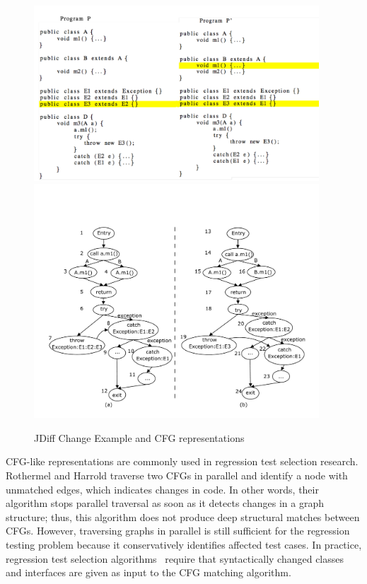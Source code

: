 \begin{figure}
\centering
\includegraphics[width=0.95\textwidth]{images/JDiffCodeExample.pdf}
\includegraphics[width=0.95\textwidth]{images/JDiffCFG.pdf}
\caption{JDiff Change Example and CFG representations~\cite{Apiwattanapong2005}} 
\label{fig:JDiff} 
\end{figure}

CFG-like representations are commonly used in regression test selection research. Rothermel and Harrold \cite{Rothermel1997} traverse two CFGs in parallel and identify a node with unmatched edges, which indicates changes in code. In other words, their algorithm stops parallel traversal as soon as it detects changes in a graph structure; thus, this algorithm does not produce deep structural matches between CFGs. However, traversing graphs in parallel is still sufficient for the regression testing problem because it conservatively identifies affected test cases. In practice, regression test selection algorithms~\cite{Harrold2001, Orso2004} require that syntactically changed classes and interfaces are given as input to the CFG matching algorithm. 

